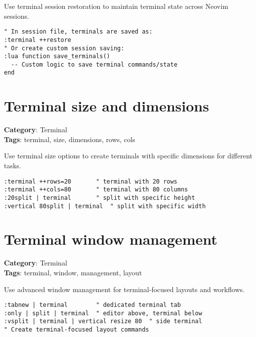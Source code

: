 {{{{{{{{{{Use terminal session restoration to maintain terminal state across Neovim sessions.

\begin{Exa*}{}
\begin{Verbatim}[fontsize=\footnotesize, breaklines, breakanywhere]
" In session file, terminals are saved as:
:terminal ++restore
" Or create custom session saving:
:lua function save_terminals()
  -- Custom logic to save terminal commands/state
end
\end{Verbatim}
\end{Exa*}

\section{Terminal size and dimensions}

\textbf{Category}: Terminal\\ \textbf{Tags}: terminal, size, dimensions, rows, cols
\vspace{0.5cm}

Use terminal size options to create terminals with specific dimensions for different tasks.

\begin{Exa*}{}
\begin{Verbatim}[fontsize=\footnotesize, breaklines, breakanywhere]
:terminal ++rows=20       " terminal with 20 rows
:terminal ++cols=80       " terminal with 80 columns
:20split | terminal       " split with specific height
:vertical 80split | terminal  " split with specific width
\end{Verbatim}
\end{Exa*}

\section{Terminal window management}

\textbf{Category}: Terminal\\ \textbf{Tags}: terminal, window, management, layout
\vspace{0.5cm}

Use advanced window management for terminal-focused layouts and workflows.

\begin{Exa*}{}
\begin{Verbatim}[fontsize=\footnotesize, breaklines, breakanywhere]
:tabnew | terminal        " dedicated terminal tab
:only | split | terminal  " editor above, terminal below
:vsplit | terminal | vertical resize 80  " side terminal
" Create terminal-focused layout commands
\end{Verbatim}
\end{Exa*}

}}}}}}}}}}
